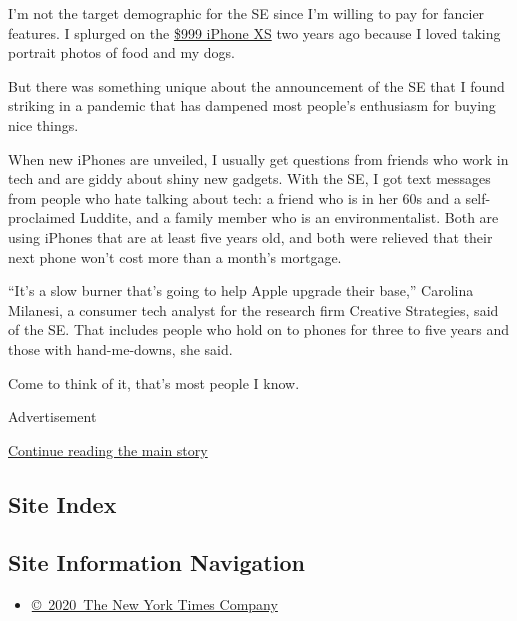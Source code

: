 I'm not the target demographic for the SE since I'm willing to pay for
fancier features. I splurged on the
\href{https://www.nytimes3xbfgragh.onion/2018/09/18/technology/personaltech/iphone-xs-max-review.html}{\$999
iPhone XS} two years ago because I loved taking portrait photos of food
and my dogs.

But there was something unique about the announcement of the SE that I
found striking in a pandemic that has dampened most people's enthusiasm
for buying nice things.

When new iPhones are unveiled, I usually get questions from friends who
work in tech and are giddy about shiny new gadgets. With the SE, I got
text messages from people who hate talking about tech: a friend who is
in her 60s and a self-proclaimed Luddite, and a family member who is an
environmentalist. Both are using iPhones that are at least five years
old, and both were relieved that their next phone won't cost more than a
month's mortgage.

``It's a slow burner that's going to help Apple upgrade their base,''
Carolina Milanesi, a consumer tech analyst for the research firm
Creative Strategies, said of the SE. That includes people who hold on to
phones for three to five years and those with hand-me-downs, she said.

Come to think of it, that's most people I know.

Advertisement

\protect\hyperlink{after-bottom}{Continue reading the main story}

\hypertarget{site-index}{%
\subsection{Site Index}\label{site-index}}

\hypertarget{site-information-navigation}{%
\subsection{Site Information
Navigation}\label{site-information-navigation}}

\begin{itemize}
\tightlist
\item
  \href{https://help.nytimes3xbfgragh.onion/hc/en-us/articles/115014792127-Copyright-notice}{©~2020~The
  New York Times Company}
\end{itemize}

